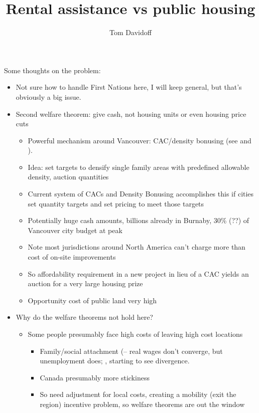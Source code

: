 \documentclass[12pt]{article}
\begin{document}
\title{Rental assistance vs public housing}
\author{Tom Davidoff}
\maketitle

Some thoughts on the problem:

\begin{itemize}
	\item Not sure how to handle First Nations here, I will keep general, but that's obviously a big issue.
	\item Second welfare theorem: give cash, not housing units or even housing price cuts
		\begin{itemize}
			\item Powerful mechanism around Vancouver: CAC/density bonusing (see \textcite{ElmendorfShanske} and \textcite{Davidoffauction}).
			\item Idea: set targets to densify single family areas with predefined allowable density, auction quantities
			\item Current system of CACs and Density Bonusing accomplishes this if cities set quantity targets and set pricing to meet those targets
			\item Potentially huge cash amounts, billions already in Burnaby, 30\% (??) of Vancouver city budget at peak
			\item Note most jurisdictions around North America can't charge more than cost of on-site improvements
			\item So affordability requirement in a new project in lieu of a CAC yields an auction for a very large housing prize
			\item Opportunity cost of public land very high
		\end{itemize}
	\item Why do the welfare theorems not hold here?
		\begin{itemize}
			\item Some people presumably face high costs of leaving high cost locations
				\begin{itemize}
					\item Family/social attachment (\textcite{BlanchardKatz}-- real wages don't converge, but unemployment does; \textcite{GlaeserAustinSummers}, starting to see divergence.
					\item Canada presumably more stickiness
					\item So need adjustment for local costs, creating a mobility (exit the region) incentive problem, so welfare theorems are out the window

\end{itemize}
\end{itemize}
\end{itemize}
\end{document}
